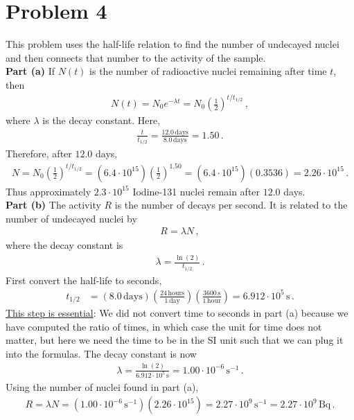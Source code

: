 \documentclass[11pt]{article}
\begin{document}
\section*{Problem 4}
This problem uses the half-life relation to find the number of undecayed nuclei and then connects that number to the activity of the sample.\\

\noindent\textbf{Part (a)} If $N(t)$ is the number of radioactive nuclei remaining after time $t$, then
\begin{align*}
N(t)=N_0 e^{-\lambda t}=N_0\left(\frac{1}{2}\right)^{t/t_{1/2}}\,,
\end{align*}
where $\lambda$ is the decay constant. Here,
\begin{align*}
\frac{t}{t_{1/2}}
=\frac{12.0\,\text{days}}{8.0\,\text{days}}
=1.50\,.
\end{align*}
Therefore, after $12.0$ days,
\begin{align*}
N=N_0\left(\frac{1}{2}\right)^{t/t_{1/2}}=(6.4\cdot 10^{15})
\left(\frac{1}{2}\right)^{1.50}=(6.4\cdot 10^{15})(0.3536)=2.26\cdot 10^{15}\,.
\end{align*}
Thus approximately $2.3\cdot 10^{15}$ Iodine-131 nuclei remain after $12.0$ days.\\

\noindent\textbf{Part (b)} The activity $R$ is the number of decays per second. It is related to the number of undecayed nuclei by
\begin{align*}
R=\lambda N\,,
\end{align*}
where the decay constant is
\begin{align*}
\lambda=\frac{\ln(2)}{t_{1/2}}\,.
\end{align*}
First convert the half-life to seconds, 
\begin{align*}
t_{1/2}&=(8.0\,\text{days})
\left(\frac{24\,\text{hours}}{1\,\text{day}}\right)
\left(\frac{3600\,\text{s}}{1\,\text{hour}}\right)=6.912\cdot 10^5\,\text{s}\,.
\end{align*}
\underline{This step is essential}: We did not convert time to seconds in part (a) because we have computed the ratio of times, in which case the unit for time does not matter, but here we need the time to be in the SI unit such that we can plug it into the formulas. The decay constant is now
\begin{align*}
\lambda
=\frac{\ln(2)}{6.912\cdot 10^5\,\text{s}}
=1.00\cdot 10^{-6}\,\text{s}^{-1}\,.
\end{align*}
Using the number of nuclei found in part (a),
\begin{align*}
R=\lambda N=(1.00\cdot 10^{-6}\,\text{s}^{-1})
(2.26\cdot 10^{15})=2.27\cdot 10^9\,\text{s}^{-1}=2.27\cdot 10^9\,\text{Bq}\,.
\end{align*}
\end{document}
